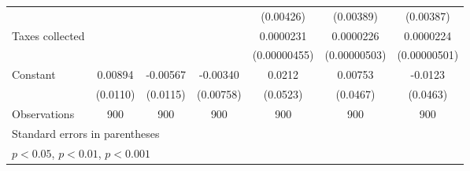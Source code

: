 {\begin{tabular}{l*{6}{c}}
                    &                     &                     &                     &   (0.00426)         &   (0.00389)         &   (0.00387)         \\
[1em]
Taxes collected     &                     &                     &                     &   0.0000231\sym{***}&   0.0000226\sym{***}&   0.0000224\sym{***}\\
                    &                     &                     &                     &(0.00000455)         &(0.00000503)         &(0.00000501)         \\
[1em]
Constant            &     0.00894         &    -0.00567         &    -0.00340         &      0.0212         &     0.00753         &     -0.0123         \\
                    &    (0.0110)         &    (0.0115)         &   (0.00758)         &    (0.0523)         &    (0.0467)         &    (0.0463)         \\
\hline
Observations        &         900         &         900         &         900         &         900         &         900         &         900         \\
\hline\hline
\multicolumn{7}{l}{\footnotesize Standard errors in parentheses}\\
\multicolumn{7}{l}{\footnotesize \sym{*} \(p<0.05\), \sym{**} \(p<0.01\), \sym{***} \(p<0.001\)}\\
\end{tabular}
}
